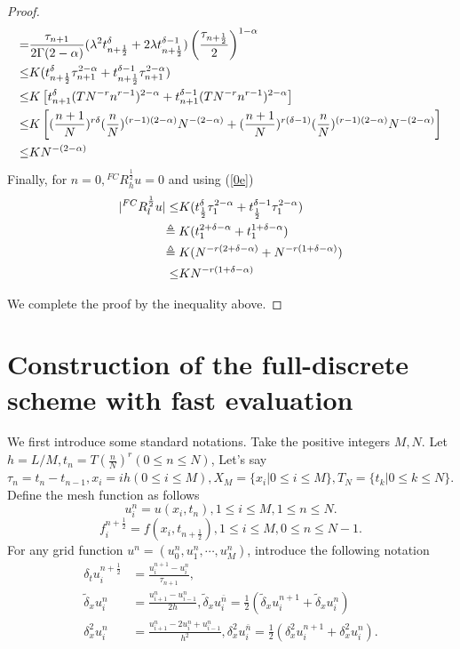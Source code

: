 \documentclass[10pt, reqno]{amsart}
\theoremstyle{remark}
\theoremstyle{definition}
\numberwithin{table}{section}
\begin{document}
\begin{proof}
\begin{align}
=&\frac{\tau_{n+1}}{2\Gamma(2-\alpha)} (\lambda^2t_{n+\frac{1}{2}}^\delta+2\lambda t_{n+\frac{1}{2}}^{\delta-1})\left(\frac{\tau_{n+\frac{1}{2}}}{2}\right)^{1-\alpha}\notag \\
\leq &K (t_{n+\frac{1}{2}}^{\delta}\tau_{n+1}^{2-\alpha}+t_{n+\frac{1}{2}}^{\delta-1}\tau_{n+1}^{2-\alpha}) \label{0e}\\
\leq &K\left[t_{n+1}^\delta(TN^{-r}n^{r-1})^{2-\alpha}+t_{n+1}^{\delta-1}(TN^{-r}n^{r-1})^{2-\alpha}\right]\notag\\
\leq &K\left[(\frac{n+1}{N})^{r\delta}(\frac{n}{N})^{(r-1)(2-\alpha)}N^{-(2-\alpha)}+(\frac{n+1}{N})^{r(\delta-1)}(\frac{n}{N})^{(r-1)(2-\alpha)}N^{-(2-\alpha)}\right]\notag\\
\leq &KN^{-(2-\alpha)}
\end{align}
Finally, for $n=0, {}^{FC}R^{\frac{1}{2}}_hu=0$ and using (\ref{0e})
    \begin{align}
    |{}^{FC}R^{\frac{1}{2}}_lu|\leq &K (t_{\frac{1}{2}}^{\delta}\tau_{1}^{2-\alpha}+t_{\frac{1}{2}}^{\delta-1}\tau_{1}^{2-\alpha})\notag\\
    \triangleq{}&K(t_1^{2+\delta-\alpha}+t_1^{1+\delta-\alpha})\notag\\
    \triangleq{} &K(N^{-r(2+\delta-\alpha)}+N^{-r(1+\delta-\alpha)})\notag\\
    \leq &KN^{-r(1+\delta-\alpha)}
    \end{align}

We complete the proof by the inequality above. 
\end{proof}


\section{Construction of the full-discrete scheme with fast evaluation}
We first introduce some standard notations. Take the positive integers $M, N$.  Let $h=L/M, t_n=T(\frac{n}{N})^r(0\leq n\leq N)$,  Let's say $\tau_n=t_n-t_{n-1}, x_i=ih(0\leq i\leq M), X_M=\{x_i|0\leq i \leq M\}, T_N=\{t_k|0\leq k\leq N\}$.  Define the mesh function as follows
$$
u_i^n = u(x_i, t_n), 1\leq i \leq M, 1\leq n\leq N. 
$$
$$
f_i^{n+\frac{1}{2}}=f(x_i, t_{n+\frac{1}{2}}), 1\leq i \leq M, 0\leq n\leq N-1. 
$$
For any grid function $u^n=(u_0^n, u_1^n, \cdots, u_M^n)$,  introduce the following notation
\begin{equation}
\begin{aligned}
{\delta}_t u_i^{n+\frac{1}{2}}&=\frac{u_i^{n+1}-u_i^n}{\tau_{n+1}}, \\
\tilde{\delta}_x u_i^n&=\frac{u_{i+1}^n-u_{i-1}^n}{2 h}, \tilde{\delta}_x u_i^{\bar{n}} = \frac{1}{2}(\tilde{\delta}_x u_i^{n+1}+\tilde{\delta}_x u_i^n) \\
\delta_x^2 u_i^n&=\frac{u^n_{i+1}-2u_i^n+u^n_{i-1}}{h^2}, \delta_x^2 u_i^{\bar{n}}=\frac{1}{2}(\delta_x^2 u_i^{n+1}+\delta_x^2 u_i^n). 
\end{aligned}
\end{equation}
\end{document}
